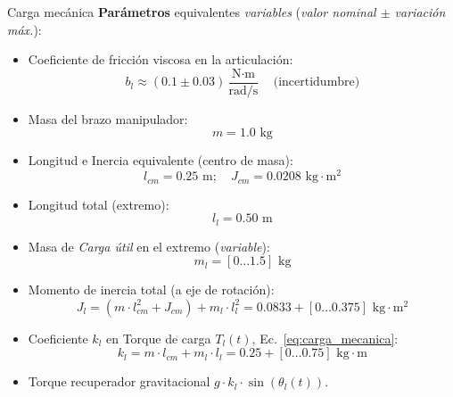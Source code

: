 \documentclass[12pt]{beamer}
\begin{document}
\begin{frame}{Carga mecánica}\scriptsize
\textbf{Parámetros} equivalentes \textit{variables} (\textit{valor nominal $\pm$ variación máx.}):

\begin{itemize}
    \item Coeficiente de fricción viscosa en la articulación:  
    \[
    b_l \approx (0.1 \pm 0.03) \frac{\text{N} \cdot \text{m}}{\text{rad/s}} \quad \text{(incertidumbre)}
    \]

    \item Masa del brazo manipulador:  
    \[
    m = 1.0 \text{ kg}
    \]

    \item Longitud e Inercia equivalente (centro de masa):  
    \[
    l_{cm} = 0.25 \text{ m}; \quad J_{cm} = 0.0208 \text{ kg}\cdot\text{m}^2
    \]

    \item Longitud total (extremo):  
    \[
    l_l = 0.50 \text{ m}
    \]

    \item Masa de \textit{Carga útil} en el extremo (\textit{variable}):  
    \[
    m_l = [0 \dots 1.5] \text{ kg}
    \]

    \item Momento de inercia total (a eje de rotación):  
    \[
    J_l = (m \cdot l_{cm}^2 + J_{cm}) + m_l \cdot l_l^2 = 0.0833 + [0 \dots 0.375] \text{ kg} \cdot \text{m}^2
    \]

    \item Coeficiente $k_l$ en Torque de carga $T_l(t)$, Ec.~\ref{eq:carga_mecanica}:  
    \[
    k_l = m \cdot l_{cm} + m_l \cdot l_l = 0.25 + [0 \dots 0.75] \text{ kg} \cdot \text{m}
    \]

    \item Torque recuperador gravitacional $g \cdot k_l \cdot \sin(\theta_l(t))$.
\end{itemize}

\end{frame}
\end{document}
